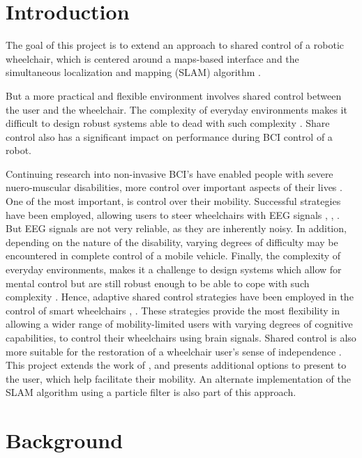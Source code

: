 \documentclass{article}
\begin{document}
\section{Introduction}
The goal of this project is to extend an approach to shared control of a robotic wheelchair, which is centered around a maps-based interface \cite{cheen_maps_2007} and the simultaneous localization and mapping (SLAM) algorithm \cite{dissanayake_solution_2001}.

But a more practical and flexible environment involves shared control between the user and the wheelchair.    The complexity of everyday environments makes it difficult to design robust systems able to dead with such complexity \cite{philips2007adaptive}.  Share control also has a significant impact on performance during BCI control of a robot.

Continuing research into non-invasive BCI's have enabled people with severe nuero-muscular disabilities, more control over important aspects of their lives \cite{vanacker_context_based_2007}.    One of the most important, is control over their mobility.  Successful strategies have been employed, allowing users to steer wheelchairs with EEG signals \cite{tanaka_electroencephalogram-based_2005}, \cite{leeb_self-pacedasynchronous_2007}, \cite{cheen_maps_2007}.  But EEG signals are not very reliable, as they are inherently noisy.  In addition, depending on the nature of the disability, varying degrees of difficulty may be encountered in complete control of a mobile vehicle.  Finally, the complexity of everyday environments, makes it a challenge to design systems which allow for mental control but are still robust enough to be able to cope with such complexity \cite{philips2007adaptive}.  Hence, adaptive shared control strategies have been employed in the control of smart wheelchairs \cite{levine_navchair_1999}, \cite{philips2007adaptive}.  These strategies provide the most flexibility in allowing a wider range of mobility-limited users with varying degrees of cognitive capabilities, to control their wheelchairs using brain signals.  Shared control is also more suitable for the restoration of a wheelchair user's sense of independence \cite{philips2007adaptive}.  This project extends the work of \cite{philips2007adaptive}, and presents additional options to present to the user, which help facilitate their mobility.  An alternate implementation of the SLAM algorithm using a particle filter is also part of this approach.


\section{Background}
\end{document}
